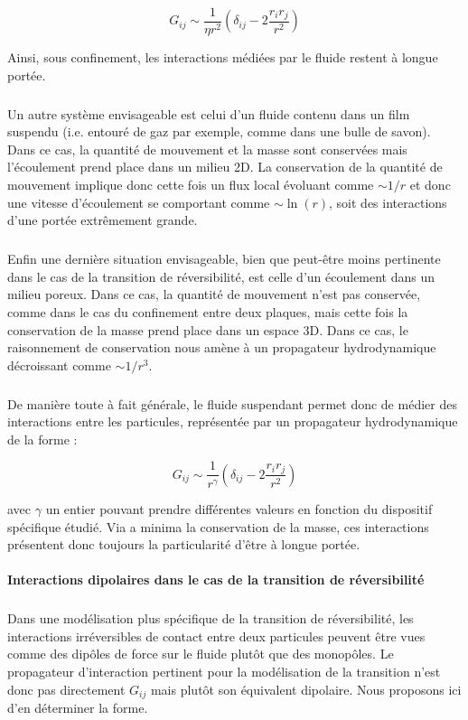 \begin{equation}
	G_{ij} \sim \frac{1}{\eta r^2}\left( \delta_{ij}-2\frac{r_ir_j}{r^2} \right)
\end{equation}

\noindent Ainsi, sous confinement, les interactions médiées par le fluide restent à longue portée.

\subparagraph{}Un autre système envisageable est celui d'un fluide contenu dans un film suspendu (i.e. entouré de gaz par exemple, comme dans une bulle de savon). Dans ce cas, la quantité de mouvement et la masse sont conservées mais l'écoulement prend place dans un milieu 2D. La conservation de la quantité de mouvement implique donc cette fois un flux local évoluant comme $\sim 1/r$ et donc une vitesse d'écoulement se comportant comme $\sim \ln (r)$, soit des interactions d'une portée extrêmement grande.

\subparagraph{}Enfin une dernière situation envisageable, bien que peut-être moins pertinente dans le cas de la transition de réversibilité, est celle d'un écoulement dans un milieu poreux. Dans ce cas, la quantité de mouvement n'est pas conservée, comme dans le cas du confinement entre deux plaques, mais cette fois la conservation de la masse prend place dans un espace 3D. Dans ce cas, le raisonnement de conservation nous amène à un propagateur hydrodynamique décroissant comme $\sim 1/r^3$.

\subparagraph{}De manière toute à fait générale, le fluide suspendant permet donc de médier des interactions entre les particules, représentée par un propagateur hydrodynamique de la forme :

\begin{equation}
	G_{ij} \sim \frac{1}{r^\gamma}\left( \delta_{ij}-2\frac{r_ir_j}{r^2} \right)
\end{equation}

\noindent avec $\gamma$ un entier pouvant prendre différentes valeurs en fonction du dispositif spécifique étudié. Via a minima la conservation de la masse, ces interactions présentent donc toujours la particularité d'être à longue portée. 

\paragraph{Interactions dipolaires dans le cas de la transition de réversibilité}

\subparagraph{}Dans une modélisation plus spécifique de la transition de réversibilité, les interactions irréversibles de contact entre deux particules peuvent être vues comme des dipôles de force sur le fluide plutôt que des monopôles. Le propagateur d'interaction pertinent pour la modélisation de la transition n'est donc pas directement $G_{ij}$ mais plutôt son équivalent dipolaire. Nous proposons ici d'en déterminer la forme.

